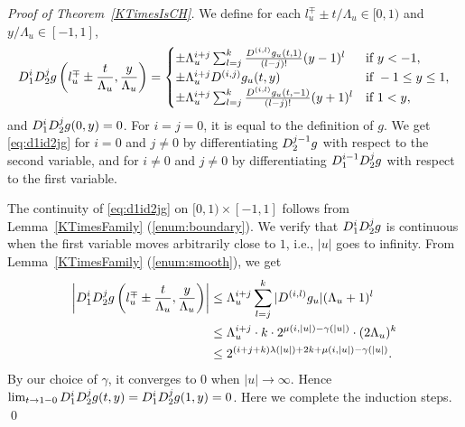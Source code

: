 \begin{proof}[Proof of Theorem~\ref{KTimesIsCH}]
We define for each $l_u^\mp \pm t/\Lambda_u \in [0,1)$ and $y/\Lambda_u \in [-1, 1]$,
\begin{equation}
   D_1^i D_2^j g \left(l^\mp_u \pm \frac{t}{\Lambda_u}, \frac{y}{\Lambda_u}\right)
   = \begin{cases}
      \pm \Lambda_u^{i+j} \sum^{k}_{l=j} \frac{D^{(i,l)} g_u(t,1)}{(l-j)!}
      (y - 1)^l &  \text{if } y < -1,
      \\
      \pm \Lambda_u^{i+j} D^{(i, j)} g_u(t, y) & \text{if } -1 \le y \le 1,
      \\
      \pm \Lambda_u^{i+j} \sum^{k}_{l=j} 
      \frac{D^{(i,l)} g_u(t, -1)}{(l-j)!} (y + 1)^l &  \text{if } 1<y,
    \end{cases}  \label{eq:d1id2jg}
\end{equation}
and $D_1^i D_2^j g(0, y) = 0$.
For $i=j=0$, it is equal to the definition of $g$.
We get \eqref{eq:d1id2jg} 
for $i=0$ and $j \neq 0$ by differentiating $D_2^{j-1} g$ with respect to the second variable, 
and for $i \neq 0$ and $j \neq 0$ by differentiating $D_1^{i-1} D_2^{j} g$
with respect to the first variable.

The continuity of \eqref{eq:d1id2jg} on $[0,1) \times [-1, 1]$ follows
from Lemma~\ref{KTimesFamily} (\ref{enum:boundary}).
We verify that $D_1^{i} D_2^{j} g$ is continuous 
when the first variable moves arbitrarily close to $1$, 
i.e., $|u|$ goes to infinity.
From Lemma~\ref{KTimesFamily} (\ref{enum:smooth}), we get
 \begin{align}
  \left|D_1^i D_2^j g \left(l^\mp_u \pm \frac{t}{\Lambda_u},
  \frac{y}{\Lambda_u}\right)\right|
  &\le 
  \Lambda_u^{i+j} \sum^{k}_{l=j} |D^{(i,l)} g_u | (\Lambda_u + 1)^l 
  \notag
  \\
  &\le
  \Lambda_u^{i+j}  \cdot k \cdot 2^{\mu(i, |u|) - \gamma(|u|)} \cdot (2\Lambda_u)^k
  \notag
  \\
  & 
  \le  2^{(i+j+k)\lambda(|u|) + 2k + \mu(i, |u|)  - \gamma(|u|)}. 
  \label{eq:sizeofderivative}
 \end{align}
By our choice of $\gamma$, 
it converges to $0$ when $|u| \to \infty$.
Hence $\lim_{t \to 1-0} D_1^i D_2^j g(t,y) = D_1^i D_2^j g(1, y) = 0$.
Here we complete the induction steps.
\qed
\end{proof} 


